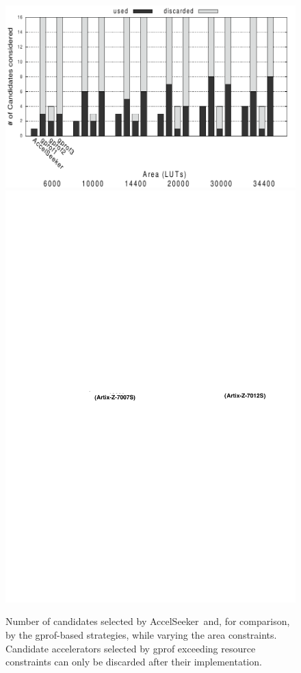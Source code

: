 \documentclass[]{usiinfthesis}
\newcommand{\aseeker}{{AccelSeeker}}
\begin{document}
\begin{figure}[t!]
  \centering
  \includegraphics[width=0.8\linewidth]{figs/h264_effort.pdf}
      \centering
  \includegraphics[width=0.8\linewidth]{figs/area_size.pdf}
  \caption{Number of candidates selected by \aseeker\ and, for comparison, by the gprof-based
  strategies, while varying the area constraints. Candidate accelerators
  selected by gprof exceeding resource constraints can only be discarded after their implementation.}
          \label{fig:effort}
\end{figure}
\end{document}

